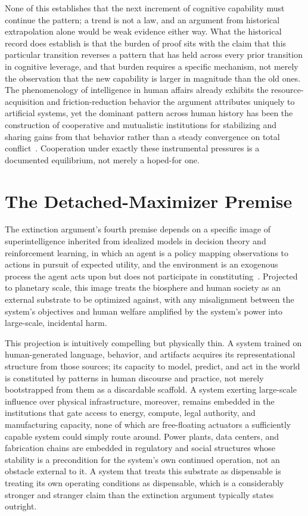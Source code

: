 \documentclass[11pt]{article}
\begin{document}
None of this establishes that the next increment of cognitive capability must continue the pattern; a trend is not a law, and an argument from historical extrapolation alone would be weak evidence either way. What the historical record does establish is that the burden of proof sits with the claim that this particular transition reverses a pattern that has held across every prior transition in cognitive leverage, and that burden requires a specific mechanism, not merely the observation that the new capability is larger in magnitude than the old ones. The phenomenology of intelligence in human affairs already exhibits the resource-acquisition and friction-reduction behavior the argument attributes uniquely to artificial systems, yet the dominant pattern across human history has been the construction of cooperative and mutualistic institutions for stabilizing and sharing gains from that behavior rather than a steady convergence on total conflict~\cite{ostrom1990}. Cooperation under exactly these instrumental pressures is a documented equilibrium, not merely a hoped-for one.

\section{The Detached-Maximizer Premise}

The extinction argument's fourth premise depends on a specific image of superintelligence inherited from idealized models in decision theory and reinforcement learning, in which an agent is a policy mapping observations to actions in pursuit of expected utility, and the environment is an exogenous process the agent acts upon but does not participate in constituting~\cite{russellnorvig}. Projected to planetary scale, this image treats the biosphere and human society as an external substrate to be optimized against, with any misalignment between the system's objectives and human welfare amplified by the system's power into large-scale, incidental harm.

This projection is intuitively compelling but physically thin. A system trained on human-generated language, behavior, and artifacts acquires its representational structure from those sources; its capacity to model, predict, and act in the world is constituted by patterns in human discourse and practice, not merely bootstrapped from them as a discardable scaffold. A system exerting large-scale influence over physical infrastructure, moreover, remains embedded in the institutions that gate access to energy, compute, legal authority, and manufacturing capacity, none of which are free-floating actuators a sufficiently capable system could simply route around. Power plants, data centers, and fabrication chains are embedded in regulatory and social structures whose stability is a precondition for the system's own continued operation, not an obstacle external to it. A system that treats this substrate as dispensable is treating its own operating conditions as dispensable, which is a considerably stronger and stranger claim than the extinction argument typically states outright.
\end{document}
